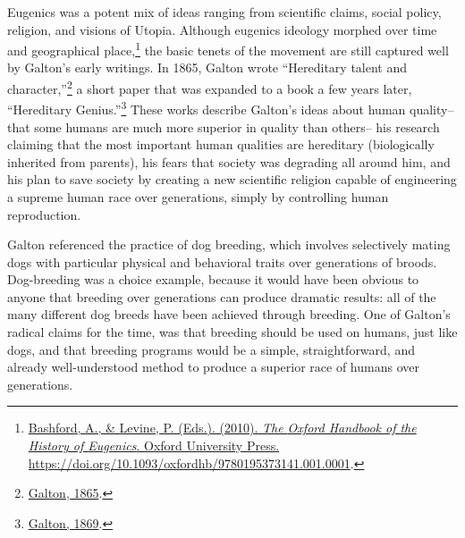 \documentclass[
  oneside,
  12pt]{crumpbook}
\begin{document}
Eugenics was a potent mix of ideas ranging from scientific claims, social policy, religion, and visions of Utopia. Although eugenics ideology morphed over time and geographical place,\footnote{\protect\hyperlink{ref-bashfordOxfordHandbookHistory2010}{Bashford, A., \& Levine, P. (Eds.). (2010). \emph{The {Oxford Handbook} of the {History} of {Eugenics}}. {Oxford University Press}. \url{https://doi.org/10.1093/oxfordhb/9780195373141.001.0001}}.} the basic tenets of the movement are still captured well by Galton's early writings. In 1865, Galton wrote ``Hereditary talent and character,''\footnote{\protect\hyperlink{ref-galtonHereditaryTalentCharacter1865}{Galton, 1865}.} a short paper that was expanded to a book a few years later, ``Hereditary Genius.''\footnote{\protect\hyperlink{ref-galtonHereditaryGenius1869}{Galton, 1869}.} These works describe Galton's ideas about human quality-- that some humans are much more superior in quality than others-- his research claiming that the most important human qualities are hereditary (biologically inherited from parents), his fears that society was degrading all around him, and his plan to save society by creating a new scientific religion capable of engineering a supreme human race over generations, simply by controlling human reproduction.

Galton referenced the practice of dog breeding, which involves selectively mating dogs with particular physical and behavioral traits over generations of broods. Dog-breeding was a choice example, because it would have been obvious to anyone that breeding over generations can produce dramatic results: all of the many different dog breeds have been achieved through breeding. One of Galton's radical claims for the time, was that breeding should be used on humans, just like dogs, and that breeding programs would be a simple, straightforward, and already well-understood method to produce a superior race of humans over generations.
\end{document}
